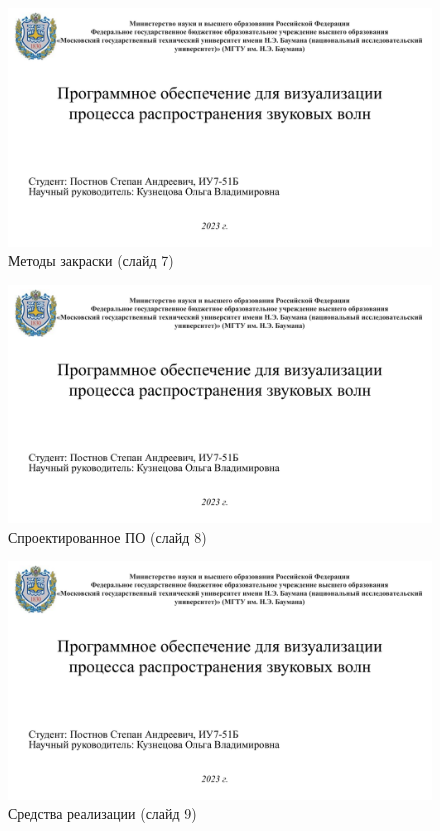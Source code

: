 \begin{figure}[h]
\centering
\includegraphics[height=0.5\textheight, page=7, angle=90]{inc/img/pres.pdf}
\caption{Методы закраски (слайд 7)}
\end{figure}
\begin{figure}[h]
\centering
\includegraphics[height=0.5\textheight, page=8, angle=90]{inc/img/pres.pdf}
\caption{Спроектированное ПО (слайд 8)}
\end{figure}
\begin{figure}[h]
\centering
\includegraphics[height=0.5\textheight, page=9, angle=90]{inc/img/pres.pdf}
\caption{Средства реализации (слайд 9)}
\end{figure}
